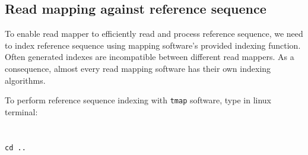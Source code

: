 \subsection{Read mapping against reference sequence}

To enable read mapper to efficiently read and process reference sequence, we need to
index reference sequence using mapping software's provided indexing function. Often generated
indexes are incompatible between different read mappers. As a consequence, almost every read
mapping software has their own indexing algorithms.

To perform reference sequence indexing with \texttt{tmap} software, type in linux terminal:\\~\\
\texttt{}\\
\texttt{cd ..}\\

